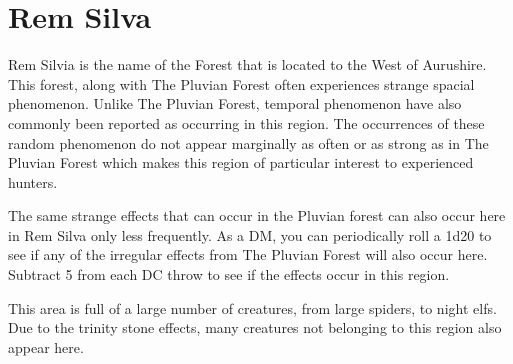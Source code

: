 \section{Rem Silva}

Rem Silvia is the name of the Forest that is located to the West of Aurushire. This forest, along with The Pluvian Forest often experiences strange spacial phenomenon. Unlike The Pluvian Forest, temporal phenomenon have also commonly been reported as occurring in this region. The occurrences of these random phenomenon do not appear marginally as often or as strong as in The Pluvian Forest which makes this region of particular interest to experienced hunters.

The same strange effects that can occur in the Pluvian forest can also occur here in Rem Silva only less frequently. As a DM, you can periodically roll a 1d20 to see if any of the irregular effects from The Pluvian Forest will also occur here. Subtract 5 from each DC throw to see if the effects occur in this region.

This area is full of a large number of creatures, from large spiders, to night elfs. Due to the trinity stone effects, many creatures not belonging to this region also appear here. 

